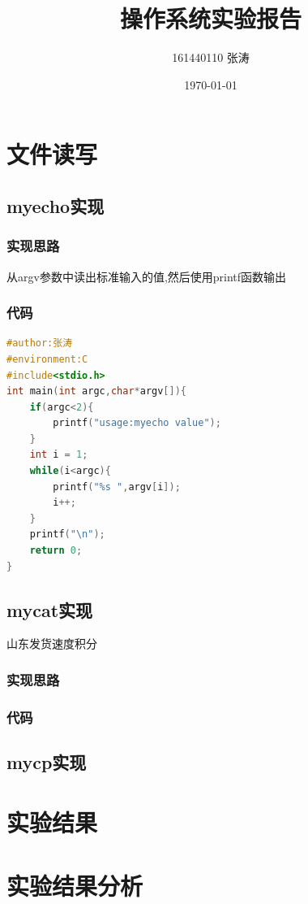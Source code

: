 \documentclass{article}
\title{\textbf{\zihao{2}操作系统实验报告\\ }}
\author{161440110 张涛}
\date{\today}
\begin{document}

\maketitle

\section{文件读写}
	\subsection{myecho实现}
	\subsubsection{实现思路}
	从argv参数中读出标准输入的值,然后使用printf函数输出
	\subsubsection{代码}
	\begin{lstlisting}[language=C]
#author:张涛
#environment:C
#include<stdio.h>
int main(int argc,char*argv[]){
    if(argc<2){
        printf("usage:myecho value");
    }
    int i = 1;
    while(i<argc){
        printf("%s ",argv[i]);
        i++;
    }
    printf("\n");
    return 0;
}
\end{lstlisting}
	\subsection{mycat实现}
	山东发货速度积分
	\subsubsection{实现思路}
	
	\subsubsection{代码}	
	\subsection{mycp实现}
\section{实验结果\cite{buettner2006x}}
\section{实验结果分析\cite{dunkels2011contikimac}}


\end{document}
